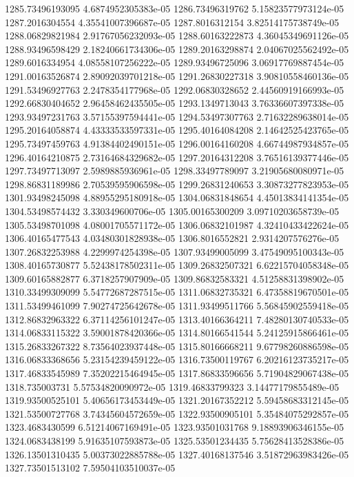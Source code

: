 {1285.73496193095 4.6874952305383e-05
1286.73496319762 5.15823577973124e-05
1287.2016304554 4.35541007396687e-05
1287.8016312154 3.82514175738749e-05
1288.06829821984 2.91767056232093e-05
1288.60163222873 4.36045349691126e-05
1288.93496598429 2.18240661734306e-05
1289.20163298874 2.04067025562492e-05
1289.6016334954 4.08558107256222e-05
1289.93496725096 3.06917769887454e-05
1291.00163526874 2.89092039701218e-05
1291.26830227318 3.90810558460136e-05
1291.53496927763 2.2478354177968e-05
1292.06830328652 2.44560919166993e-05
1292.66830404652 2.96458462435505e-05
1293.1349713043 3.76336607397338e-05
1293.93497231763 3.57155397594441e-05
1294.53497307763 2.71632289638014e-05
1295.20164058874 4.43333533597331e-05
1295.40164084208 2.14642525423765e-05
1295.73497459763 4.91384402490151e-05
1296.00164160208 4.66744987934857e-05
1296.40164210875 2.73164684329682e-05
1297.20164312208 3.76516139377446e-05
1297.73497713097 2.5989885936961e-05
1298.33497789097 3.21905680080971e-05
1298.86831189986 2.70539595906598e-05
1299.26831240653 3.30873277823953e-05
1301.93498245098 4.88955295180918e-05
1304.06831848654 4.45013834141354e-05
1304.53498574432 3.330349600706e-05
1305.00165300209 3.09710203658739e-05
1305.53498701098 4.08001705571172e-05
1306.06832101987 4.32410433422624e-05
1306.40165477543 4.03480301828938e-05
1306.8016552821 2.9314207576276e-05
1307.26832253988 4.2299974254398e-05
1307.93499005099 3.47549095100343e-05
1308.40165730877 5.52438178502311e-05
1309.26832507321 6.62215704058348e-05
1309.60165882877 6.3718257907909e-05
1309.86832583321 4.51258831398902e-05
1310.33499309099 5.54772687287515e-05
1311.06832735321 6.47358819670501e-05
1311.53499461099 7.90274725642678e-05
1311.93499511766 5.56845902559418e-05
1312.86832963322 6.37114256101247e-05
1313.40166364211 7.48280130740533e-05
1314.06833115322 3.59001878420366e-05
1314.80166541544 5.24125915866461e-05
1315.26833267322 8.73564023937448e-05
1315.80166668211 9.67798260886598e-05
1316.06833368656 5.23154239459122e-05
1316.73500119767 6.20216123735217e-05
1317.46833545989 7.35202215464945e-05
1317.86833596656 5.71904829067438e-05
1318.735003731 5.57534820090972e-05
1319.46833799323 3.14477179855489e-05
1319.93500525101 5.40656173453449e-05
1321.20167352212 5.59458683312145e-05
1321.53500727768 3.74345604572659e-05
1322.93500905101 5.35484075292857e-05
1323.4683430599 6.51214067169491e-05
1323.93501031768 9.18893906346155e-05
1324.0683438199 5.91635107593873e-05
1325.53501234435 5.75628413528386e-05
1326.13501310435 5.00373022885788e-05
1327.40168137546 3.51872963983426e-05
1327.73501513102 7.59504103510037e-05
}
